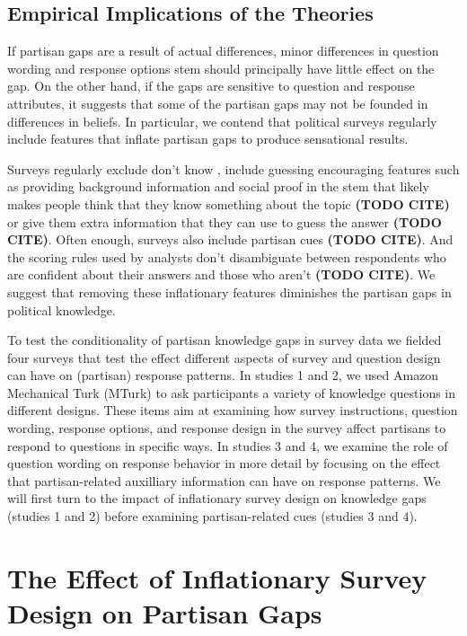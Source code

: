 \documentclass[12pt, letterpaper]{article}
\begin{document}
\subsection*{Empirical Implications of the Theories}

If partisan gaps are a result of actual differences, minor differences in question wording and response options stem should principally have little effect on the gap. On the other hand, if the gaps are sensitive to question and response attributes, it suggests that some of the partisan gaps may not be founded in differences in beliefs. In particular, we contend that political surveys regularly include features that inflate partisan gaps to produce sensational results.

Surveys regularly exclude don't know \citep{luskin2011don}, include guessing encouraging features such as providing background information and social proof in the stem that likely makes people think that they know something about the topic \textbf{(TODO CITE)} or give them extra information that they can use to guess the answer \textbf{(TODO CITE)}. Often enough, surveys also include partisan cues \textbf{(TODO CITE)}. And the scoring rules used by analysts don't disambiguate between respondents who are confident about their answers and those who aren't \textbf{(TODO CITE)}. We suggest that removing these inflationary features diminishes the partisan gaps in political knowledge.

To test the conditionality of partisan knowledge gaps in survey data we fielded four surveys that test the effect different aspects of survey and question design can have on (partisan) response patterns. In studies 1 and 2, we used Amazon Mechanical Turk (MTurk) to ask participants a variety of knowledge questions in different designs. These items aim at examining how survey instructions, question wording, response options, and response design in the survey affect partisans to respond to questions in specific ways. In studies 3 and 4, we examine the role of question wording on response behavior in more detail by focusing on the effect that partisan-related auxilliary information can have on response patterns. We will first turn to the impact of inflationary survey design on knowledge gaps (studies 1 and 2) before examining partisan-related cues (studies 3 and 4).

\newpage

\section*{The Effect of Inflationary Survey Design on Partisan Gaps}
\label{sec:inflationary_measures}
\end{document}

